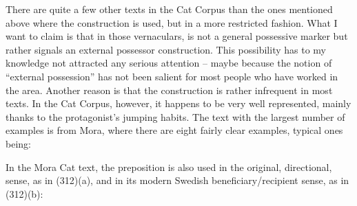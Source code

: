 There are quite a few other texts in the Cat Corpus than the ones mentioned above where the construction is used, but in a more restricted fashion. What I want to claim is that in those vernaculars, is not a general possessive marker but rather signals an external possessor construction. This possibility has to my knowledge not attracted any serious attention – maybe because the notion of “external possession” has not been salient for most people who have worked in the area. Another reason is that the construction is rather infrequent in most texts. In the Cat Corpus, however, it happens to be very well represented, mainly thanks to the protagonist’s jumping habits. The text with the largest number of examples is from Mora, where there are eight fairly clear examples, typical ones being:


\ea\label{}

\z 
\z

In the Mora Cat text, the preposition is also used in the original, directional, sense, as in (312)(a), and in its modern Swedish beneficiary/recipient sense, as in (312)(b):


\ea\label{}

\z 
\z

